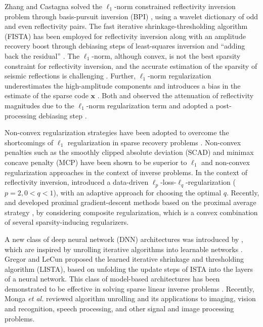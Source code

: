 \documentclass[journal]{IEEEtran}
\begin{document}
Zhang and Castagna \cite{zhang2011seismic} solved the $\ell_1$-norm constrained reflectivity inversion problem through basis-pursuit inversion (BPI) \cite{chen2001atomic}, using a wavelet dictionary of odd and even reflectivity pairs. The fast iterative shrinkage-thresholding algorithm (FISTA) \cite{beck2009fast} has been employed for reflectivity inversion \cite{perez2012inversion} along with an amplitude recovery boost through debiasing steps of least-squares inversion \cite{perez2013high} and ``adding back the residual'' \cite{li2020debiasing}. The $\ell_1$-norm, although convex, is not the best sparsity constraint for reflectivity inversion, and the accurate estimation of the sparsity of seismic reflections is challenging \cite{li2019optimal, yuan2019seismic}. Further, $\ell_1$-norm regularization underestimates the high-amplitude components and introduces a bias in the estimate of the sparse code $\boldsymbol{x}$ \cite{candes2008enhancing, zhang2010analysis, selesnick2017sparse}. Both \cite{perez2013high} and \cite{li2020debiasing} observed the attenuation of reflectivity magnitudes due to the $\ell_1$-norm regularization term and adopted a post-processing debiasing step \cite{wright2009sparse}.

Non-convex regularization strategies have been adopted to overcome the shortcomings of $\ell_1$ regularization in sparse recovery problems \cite{selesnick2017sparse, zhang2010nearly, woodworth2016compressed}. Non-convex penalties such as the smoothly clipped absolute deviation (SCAD) \cite{fan2001variable} and minimax concave penalty (MCP) \cite{zhang2010nearly} have been shown to be superior to $\ell_1$ and non-convex regularization approaches in the context of inverse problems. In the context of reflectivity inversion, \cite{li2019optimal} introduced a data-driven $\ell_p$-loss-$\ell_q$-regularization ($p=2, 0<q<1$), with an adaptive approach for choosing the optimal $q$. Recently, \cite{zhong2014gradient} and \cite{kamilov2016parallel} developed proximal gradient-descent methods based on the proximal average strategy \cite{bauschke2008proximal, yu2013better}, by considering composite regularization, which is a convex combination of several sparsity-inducing regularizers. 

A new class of deep neural network (DNN) architectures was introduced by \cite{gregor2010learning}, which are inspired by unrolling iterative algorithms into learnable networks \cite{monga2021algorithm}. Gregor and LeCun \cite{gregor2010learning} proposed the learned iterative shrinkage and thresholding algorithm (LISTA), based on unfolding the update steps of ISTA \cite{daubechies2004iterative} into the layers of a neural network. This class of model-based architectures has been demonstrated to be effective in solving sparse linear inverse problems \cite{mahapatra2017deep, mukherjee2017dnns, zhang2017ista, borgerding2017amp, sreter2018learned, liu2019deep, pokala2019firmnet, li2020efficient, shlezinger2020modelbased, pokala2020confirmnet, wang2020dnu, tolooshams2020deep, jawali2020cornet, tolooshams2021unfolding}. Recently, Monga {\it et al.} \cite{monga2021algorithm} reviewed algorithm unrolling and its applications to imaging, vision and recognition, speech processing, and other signal and image processing problems. 
\end{document}
